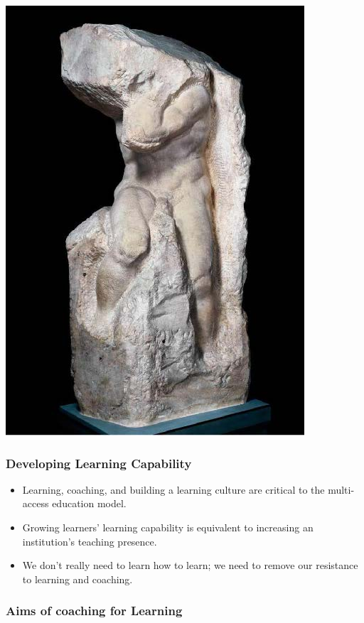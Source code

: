 \documentclass[
]{book}
\providecommand{\tightlist}{%
  \setlength{\itemsep}{0pt}\setlength{\parskip}{0pt}}
\begin{document}
\includegraphics{assets/presentations/coaching/mike.jpg}

\hypertarget{developing-learning-capability}{%
\subsubsection*{Developing Learning Capability}\label{developing-learning-capability}}

\begin{itemize}
\tightlist
\item
  Learning, coaching, and building a learning culture are critical to the multi-access education model.
\item
  Growing learners' learning capability is equivalent to increasing an institution's teaching presence.
\item
  We don't really need to learn how to learn; we need to remove our resistance to learning and coaching.
\end{itemize}

\hypertarget{aims-of-coaching-for-learning}{%
\subsubsection*{Aims of coaching for Learning}\label{aims-of-coaching-for-learning}}
\end{document}
